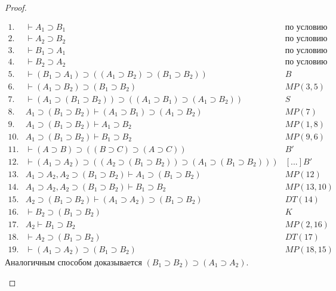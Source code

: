 \begin{proof}
\begin{itemize}
        \begin{equation*}
            \begin{array}{lll}
                1. & \vdash A_1 \supset B_1 & \text{по условию} \\ 
                2. & \vdash A_2 \supset B_2 & \text{по условию} \\
                3. & \vdash B_1 \supset A_1 & \text{по условию} \\
                4. & \vdash B_2 \supset A_2 & \text{по условию} \\
                5. & \vdash (B_1 \supset A_1) \supset ((A_1 \supset B_2)\supset(B_1 \supset B_2)) & B \\ 
                6. & \vdash (A_1 \supset B_2)\supset(B_1 \supset B_2) & MP(3, 5) \\ 
                7. & \vdash (A_1 \supset (B_1 \supset B_2)) \supset ((A_1 \supset B_1) \supset (A_1 \supset B_2)) & S \\ 
                8. & A_1 \supset (B_1 \supset B_2) \vdash (A_1 \supset B_1) \supset (A_1 \supset B_2) & MP(7) \\ 
                9. & A_1 \supset (B_1 \supset B_2) \vdash A_1 \supset B_2 & MP(1, 8) \\ 
                10. & A_1 \supset (B_1 \supset B_2) \vdash B_1 \supset B_2 & MP(9, 6) \\ 
                11. & \vdash (A \supset B) \supset ((B\supset C) \supset (A \supset C)) & B' \\ 
                12. & \vdash (A_1 \supset A_2) \supset ((A_2\supset (B_1 \supset B_2)) \supset (A_1 \supset (B_1 \supset B_2))) & [...]B' \\ 
                13. & A_1 \supset A_2, A_2\supset (B_1 \supset B_2) \vdash A_1 \supset (B_1 \supset B_2) & MP(12) \\ 
                14. & A_1 \supset A_2, A_2\supset (B_1 \supset B_2) \vdash B_1 \supset B_2 & MP(13, 10) \\ 
                15. & A_2\supset (B_1 \supset B_2) \vdash (A_1 \supset A_2) \supset (B_1 \supset B_2) & DT(14) \\ 
                16. & \vdash B_2 \supset (B_1 \supset B_2) & K \\ 
                17. & A_2 \vdash B_1 \supset B_2 & MP(2, 16) \\ 
                18. & \vdash A_2 \supset (B_1 \supset B_2) & DT(17) \\ 
                19. & \vdash (A_1 \supset A_2) \supset (B_1 \supset B_2) & MP(18, 15)
            \end{array}
        \end{equation*}
        Аналогичным способом доказывается $(B_1 \supset B_2) \supset (A_1 \supset A_2)$.


\end{itemize}
\end{proof}
